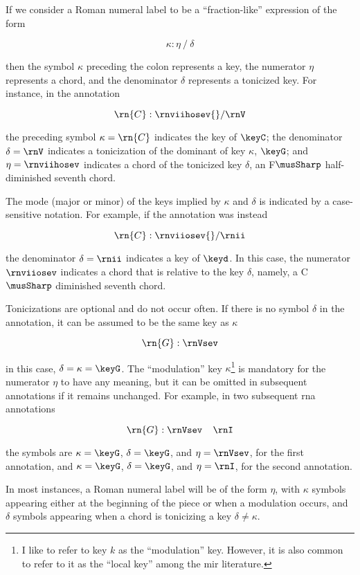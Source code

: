 
If we consider a Roman numeral label to be a
``fraction-like'' expression of the form

\begin{equation}
    \kappa : \eta \: / \: \delta
\end{equation}

then the symbol $\kappa$ preceding the colon represents a
key, the numerator $\eta$ represents a chord, and the
denominator $\delta$ represents a tonicized key. For
instance, in the annotation 

\begin{equation}
    \rn{C}:\rnviihosev{}/\rnV
\end{equation}

the preceding symbol $\kappa=\rn{C}$ indicates the key of
$\keyC$; the denominator $\delta = \rnV$ indicates a
tonicization of the dominant of key $\kappa$, $\keyG$; and
$\eta=\rnviihosev$ indicates a chord of the tonicized key
$\delta$, an F$\musSharp$ half-diminished seventh chord.

The mode (major or minor) of the keys implied by $\kappa$
and $\delta$ is indicated by a case-sensitive notation. For
example, if the annotation was instead

\begin{equation}
    \rn{C}:\rnviiosev{}/\rnii
\end{equation}

the denominator $\delta=\rnii$ indicates a key of $\keyd$.
In this case, the numerator $\rnviiosev$ indicates a chord
that is relative to the key $\delta$, namely, a C$\musSharp$
diminished seventh chord.

Tonicizations are optional and do not occur often. If there
is no symbol $\delta$ in the annotation, it can be assumed
to be the same key as $\kappa$

\begin{equation}
    \rn{G}:\rnVsev
\end{equation}

in this case, $\delta = \kappa = \keyG$. The ``modulation''
key $\kappa$\footnote{I like to refer to key $k$ as the
``modulation'' key. However, it is also common to refer to
it as the ``local key'' among the \gls{mir} literature.} is
mandatory for the numerator $\eta$ to have any meaning, but
it can be omitted in subsequent annotations if it remains
unchanged. For example, in two subsequent \gls{rna}
annotations

\begin{equation}
    \rn{G}:\rnVsev \;\;\;\; \rnI
\end{equation}

the symbols are $\kappa=\keyG$, $\delta=\keyG$, and
$\eta=\rnVsev$, for the first annotation, and
$\kappa=\keyG$, $\delta=\keyG$, and $\eta=\rnI$, for the
second annotation.

In most instances, a Roman numeral label will be of the form
$\eta$, with $\kappa$ symbols appearing either at the
beginning of the piece or when a modulation occurs, and
$\delta$ symbols appearing when a chord is tonicizing a key
$\delta \neq \kappa$.
